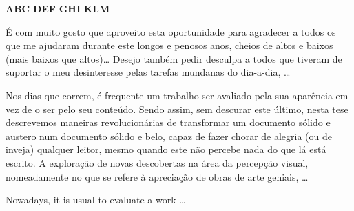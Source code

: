 \documentclass[11pt,twoside,a4paper]{report}
\begin{document}
\TitlePage
  \vspace*{55mm}
       {}
       {\textbf{ABC}}
  \vspace*{5mm}
       {\textbf{DEF}}
  \vspace*{5mm}
  \TEXT{}
       {\textbf{GHI}}
  \vspace*{5mm}
  \TEXT{}
       {\textbf{KLM}}
\EndTitlePage
\titlepage\ \endtitlepage %

\TitlePage
  \vspace*{55mm}
       {\'E com muito gosto que aproveito esta oportunidade para agradecer a todos os que me
        ajudaram durante este longos e penosos anos, cheios de altos e baixos (mais baixos que
        altos)\ldots}
  \TEXT{}
       {Desejo tamb\'em pedir desculpa a todos que tiveram de suportar o meu desinteresse pelas
        tarefas mundanas do dia-a-dia, \ldots}
\EndTitlePage
\titlepage\ \endtitlepage %

\TitlePage
  \vspace*{55mm}
       {Nos dias que correm, \'e frequente um trabalho ser avaliado pela sua apar\^encia em vez de
        o ser pelo seu conte\'udo. Sendo assim, sem descurar este \'ultimo, nesta tese descrevemos
        maneiras revolucion\'arias de transformar um documento s\'olido e austero num documento
        s\'olido e belo, capaz de fazer chorar de alegria (ou de inveja) qualquer leitor, mesmo
        quando este n\~ao percebe nada do que l\'a est\'a escrito.}
  \TEXT{}
       {A explora\c c\~ao de novas descobertas na \'area da percep\c c\~ao visual, nomeadamente
        no que se refere \`a aprecia\c c\~ao de obras de arte geniais, \ldots}
\EndTitlePage
\titlepage\ \endtitlepage %

\TitlePage
  \vspace*{55mm}
       {Nowadays, it is usual to evaluate a work \ldots}
\EndTitlePage
\titlepage\ \endtitlepage %
\end{document}
